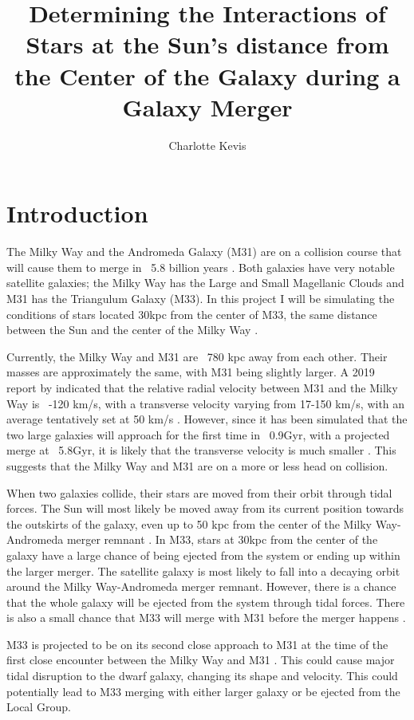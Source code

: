 \documentclass{aastex63}
\begin{document}
\title{Determining the Interactions of Stars at the Sun's distance from the Center of the Galaxy during a Galaxy Merger}

\author{Charlotte Kevis}

\section{Introduction} \label{sec:intro}
The Milky Way and the Andromeda Galaxy (M31) are on a collision course that will cause them to merge in ~5.8 billion years \citep{VDM12}. Both galaxies have very notable satellite galaxies; the Milky Way has the Large and Small Magellanic Clouds and M31 has the Triangulum Galaxy (M33). In this project I will be simulating the conditions of stars located 30kpc from the center of M33, the same distance between the Sun and the center of the Milky Way \citep{Branham17}.

Currently, the Milky Way and M31 are ~780 kpc away from each other. Their masses are approximately the same, with M31 being slightly larger. A 2019 report by \cite{Schiavi19} indicated that the relative radial velocity between M31 and the Milky Way is ~-120 km/s, with a transverse velocity varying from 17-150 km/s, with an average tentatively set at 50 km/s \citep{Schiavi19}. However, since it has been simulated that the two large galaxies will approach for the first time in ~0.9Gyr, with a projected merge at ~5.8Gyr, it is likely that the transverse velocity is much smaller \citep{VDM12}. This suggests that the Milky Way and M31 are on a more or less head on collision. 

When two galaxies collide, their stars are moved from their orbit through tidal forces. The Sun will most likely be moved away from its current position towards the outskirts of the galaxy, even up to 50 kpc from the center of the Milky Way-Andromeda merger remnant \citep{VDM12}. In M33, stars at 30kpc from the center of the galaxy have a large chance of being ejected from the system or ending up within the larger merger. The satellite galaxy is most likely to fall into a decaying orbit around the Milky Way-Andromeda merger remnant. However, there is a chance that the whole galaxy will be ejected from the system through tidal forces. There is also a small chance that M33 will merge with M31 before the merger happens \citep{VDM12}. 

M33 is projected to be on its second close approach to M31 at the time of the first close encounter between the Milky Way and M31 \citep{VDM12}. This could cause major tidal disruption to the dwarf galaxy, changing its shape and velocity. This could potentially lead to M33 merging with either larger galaxy or be ejected from the Local Group.
\end{document}
